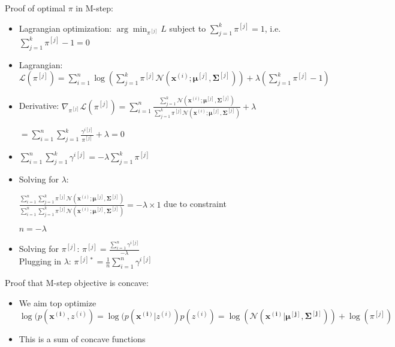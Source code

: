 Proof of optimal $\pi$ in M-step:
\begin{itemize}
    \item \With Lagrangian optimization:
    $
    \arg\min_{\pi^{[j]}} L
    $ subject to $\sum_{j=1}^k \pi^{[j]} = 1$, i.e. $\sum_{j=1}^k \pi^{[j]} -1 = 0$

    \item Lagrangian: $
    \mathcal{L}(\pi^{[j]}) = \sum_{i=1}^n \log \left( \sum_{j=1}^k \pi^{[j]} \mathcal{N}\left( \boldsymbol{x}^{(i)}; \boldsymbol{\mu}^{[j]}, \boldsymbol{\Sigma}^{[j]} \right) \right) + \lambda \left( \sum_{j=1}^k \pi^{[j]} - 1 \right)
    $

    \item Derivative:
    $
    \nabla_{\pi^{[j]}} \mathcal{L}(\pi^{[j]}) = \sum_{i=1}^n \frac{\sum_{j=1}^k \mathcal{N}\left( \boldsymbol{x}^{(i)}; \boldsymbol{\mu}^{[j]}, \boldsymbol{\Sigma}^{[j]} \right)}{\sum_{j=1}^k \pi^{[j]} \mathcal{N}\left( \boldsymbol{x}^{(i)}; \boldsymbol{\mu}^{[j]}, \boldsymbol{\Sigma}^{[j]} \right)} + \lambda
    $

    $
    = \sum_{i=1}^n \sum_{j=1}^k \frac{\gamma^{i[j]}}{\pi^{[j]}} + \lambda = 0
    $

    \item $
    \sum_{i=1}^n \sum_{j=1}^k \gamma^{i[j]} = -\lambda \sum_{j=1}^k \pi^{[j]}
    $

    \item Solving for $\lambda$:

    $
    \frac{\sum_{i=1}^n \sum_{j=1}^k \pi^{[j]} \mathcal{N}\left( \boldsymbol{x}^{(i)}; \boldsymbol{\mu}^{[j]}, \boldsymbol{\Sigma}^{[j]} \right)}{\sum_{i=1}^n \sum_{j=1}^k \pi^{[j]} \mathcal{N}\left( \boldsymbol{x}^{(i)}; \boldsymbol{\mu}^{[j]}, \boldsymbol{\Sigma}^{[j]} \right)} = -\lambda \times 1
    $ due to constraint

    $
    n = -\lambda
    $

    \item Solving for $\pi^{[j]}$:
    $
    \pi^{[j]} = \frac{\sum_{i=1}^n \gamma^{i[j]}}{-\lambda}
    $\\
    Plugging in $\lambda$:
    $
    \pi^{[j]*} = \frac{1}{n} \sum_{i=1}^n \gamma^{i[j]}
    $
\end{itemize} 
Proof that M-step objective is concave:
\begin{itemize}
    \item We aim top optimize $\log( p(\boldsymbol{x^{(i)}}, z^{(i)}) = \log( p(\boldsymbol{x^{(i)}} | z^{(i)})p(z^{(i)}) = \log(\mathcal{N}(\boldsymbol{x^{(i)}} | \boldsymbol{\mu^{[j]}}, \boldsymbol{\Sigma^{[j]}})) + \log(\pi^{[j]})$
    \item This is a sum of concave functions
\end{itemize}


